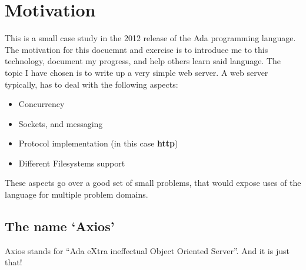\section{Motivation} 
This is a small case study in the 2012 release of the Ada programming language. The motivation for this docuemnt and exercise is to introduce me to this technology, document my progress, and help others learn said language. The topic I have chosen is to write up a very simple web server. A web server typically, has to deal with the following aspects:
\begin{itemize}
\item Concurrency
\item Sockets, and messaging
\item Protocol implementation (in this case \textbf{http})
\item Different Filesystems support 
\end{itemize} 

These aspects go over a good set of small problems, that would expose uses of the language for multiple problem domains. 

\subsection{The name `Axios'}
Axios stands for ``Ada eXtra ineffectual Object Oriented Server''. And it is just that!